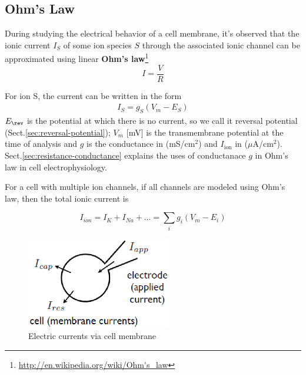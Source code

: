\subsection{Ohm's Law}
\label{sec:ohms-law}

During studying the electrical behavior of a cell membrane, it's observed that
the ionic current $I_S$ of some ion species $S$ through the associated ionic
channel can be approximated using linear {\bf Ohm's
law}\footnote{\url{http://en.wikipedia.org/wiki/Ohm's_law}}
\begin{equation}
  \label{eq:50}
  I = \frac{V}{R}
\end{equation}

For ion S, the current can be written in the form
\begin{eqnarray}
  \label{eq:545}
  I_S = g_S (V_m-E_S)
\end{eqnarray}
$E_\rev$ is the potential at which there is no current, so we call it reversal
potential (Sect.\ref{sec:reversal-potential}); $V_m$ [mV] is the transmembrane
potential at the time of analysis and $g$ is the conductance in (mS/cm$^2$) and
$I_\text{ion}$ in ($\mu$A/cm$^2$). Sect.\ref{sec:resistance-conductance}
explains the uses of conductanace $g$ in Ohm's law in cell electrophysiology.
 
\begin{mdframed}
For a cell with multiple ion channels, if all channels are modeled using
Ohm's law, then the total ionic current is

\begin{equation}
  \label{eq:30}
  I_{ion} = I_K + I_{Na} +... = \sum_i g_i (V_m-E_i)
\end{equation}

\end{mdframed}

\begin{figure}[htb]
  \centerline{\includegraphics[height=4cm]{./images/current_in_cell.eps}}
  \caption{Electric currents via cell membrane}\label{fig:electric_current}
\end{figure}
 
